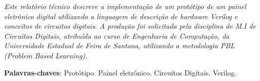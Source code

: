 \documentclass[
	11pt,				%
	openany,			%
	oneside,
	a4paper,			%
	chapter=TITLE,		%
	section=TITLE,		%
	english,			%
	brazil				%
	]{abntex2}
\begin{document}
\frenchspacing 
\textual
\pagestyle{uefs-pbl}
\imprimircabecalho
\begingroup
\let\clearpage\relax
\begin{resumoumacoluna}
\textit{Este relatório técnico descreve a implementação de um protótipo de um painel eletrônico digital utilizando a linguagem de descrição de hardware Verilog e conceitos de circuitos digitais. A produção foi solicitada pela disciplina de M.I de Circuitos Digitais, atribuída ao curso de Engenharia de Computação, da Universidade Estadual de Feira de Santana, utilizando a metodologia PBL (Problem Based Learning).}

 \vspace{\onelineskip}
 
 \noindent
 \textbf{Palavras-chaves}: Protótipo. Painel eletrônico. Circuitos Digitais. Verilog.
\end{resumoumacoluna}










\postextual
\endgroup


\end{document}
